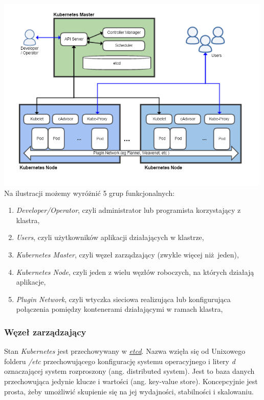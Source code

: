 \documentclass[a4paper,12pt,twoside,openany]{report}
\providecommand{\tightlist}{%
  \setlength{\itemsep}{0pt}\setlength{\parskip}{0pt}}
\begin{document}
\includegraphics[width=5.20833in,height=3.6875in]{assets/kubernetes-architecture.png}\\

Na ilustracji możemy wyróżnić 5 grup funkcjonalnych:

\begin{enumerate}
\def\labelenumi{\arabic{enumi}.}
\tightlist
\item
  \emph{Developer/Operator}, czyli administrator lub programista
  korzystający z klastra,
\item
  \emph{Users}, czyli użytkowników aplikacji działających w klastrze,
\item
  \emph{Kubernetes Master}, czyli węzeł zarządzający (zwykle więcej
  niż~jeden),
\item
  \emph{Kubernetes Node}, czyli jeden z wielu węzłów roboczych, na
  których działają aplikacje,
\item
  \emph{Plugin Network}, czyli wtyczka sieciowa realizująca lub
  konfigurująca połączenia pomiędzy kontenerami działającymi w ramach
  klastra,
\end{enumerate}

\hypertarget{wux119zeux142-zarzux105dzajux105cy}{%
\subsubsection{Węzeł
zarządzający}\label{wux119zeux142-zarzux105dzajux105cy}}

Stan \emph{Kubernetes} jest przechowywany w
\href{https://coreos.com/etcd/}{\emph{etcd}}. Nazwa wzięła się od
Unixowego folderu \emph{/etc} przechowującego konfigurację systemu
operacyjnego i litery \emph{d} oznaczającej system rozproszony (ang.
distributed system). Jest to baza danych przechowująca jedynie klucze i
wartości (ang. key-value store). Koncepcyjnie jest prosta, żeby
umożliwić skupienie się na jej wydajności, stabilności i skalowaniu.
\end{document}
